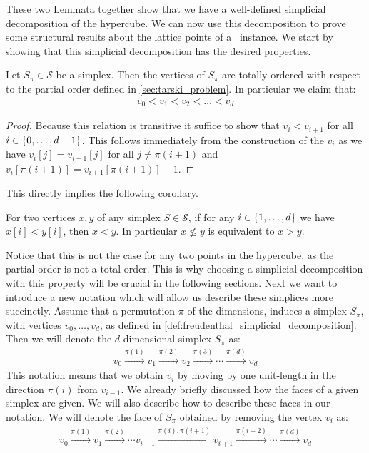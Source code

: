 These two Lemmata together show that we have a well-defined simplicial decomposition of the hypercube. We can now use this decomposition to prove some structural results about the lattice points of a \Tarski\ instance. We start by showing that this simplicial decomposition has the desired properties.
\begin{lemma}
	Let $S_{\pi} \in \mathcal{S}$ be a simplex. Then the vertices of $S_{\pi}$ are totally ordered with respect to the partial order defined in \cref{sec:tarski_problem}. In particular we claim that:
	\begin{align*}
		v_0 < v_1 < v_2 < \dots < v_d
	\end{align*}
\end{lemma}
\begin{proof}
	Because this relation is transitive it suffice to show that $v_i < v_{i+1}$ for all $i \in \left\{0, \dots, d-1\right\}$. This follows immediately from the construction of the $v_i$ as we have $v_i[j] = v_{i+1}[j]$ for all $j \neq \pi(i+1)$ and $v_i[\pi(i+1)] = v_{i+1}[\pi(i+1)] - 1$.
\end{proof}
This directly implies the following corollary.
\begin{corollary}
	\label{cor:total_ordering}
	For two vertices $x,y$ of any simplex $S \in \mathcal{S}$, if for any $i \in \left\{1, \dots, d\right\}$ we have $x[i] < y[i]$, then $x < y$. In particular $x \not\leq y$ is equivalent to $x > y$.
\end{corollary}
Notice that this is not the case for any two points in the hypercube, as the partial order is not a total order. This is why choosing a simplicial decomposition with this property will be crucial in the following sections. Next we want to introduce a new notation which will allow us describe these simplices more succinctly. Assume that a permutation $\pi$ of the dimensions, induces a simplex $S_{\pi}$, with vertices $v_0, \dots, v_d$, as defined in \cref{def:freudenthal_simplicial_decomposition}. Then we will denote the $d$-dimensional simplex $S_{\pi}$ as:
\begin{align*}
	v_0 \xrightarrow{\pi(1)} v_1 \xrightarrow{\pi(2)} v_2 \xrightarrow{\pi(3)} \cdots \xrightarrow{\pi(d)} v_d
\end{align*}
This notation means that we obtain $v_i$ by moving by one unit-length in the direction $\pi(i)$ from $v_{i-1}$. We already briefly discussed how the faces of a given simplex are given. We will also describe how to describe these faces in our notation. We will denote the face of $S_{\pi}$ obtained by removing the vertex $v_i$ as:
\begin{align*}
	v_0 \xrightarrow{\pi(1)} v_1 \xrightarrow{\pi(2)} \cdots v_{i-1} \xrightarrow{\pi(i), \pi(i+1)} v_{i+1} \xrightarrow{\pi(i+2)} \cdots \xrightarrow{\pi(d)} v_d
\end{align*}

